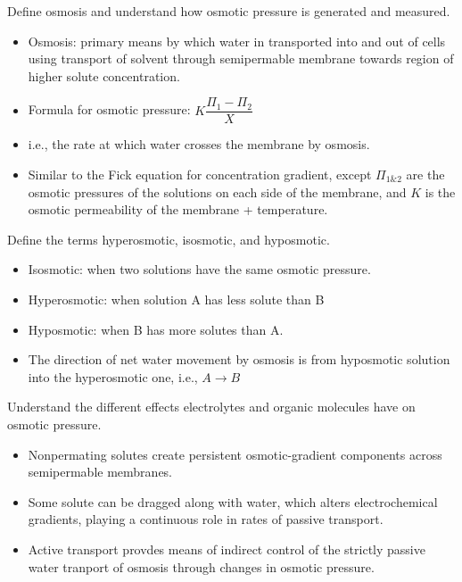 \documentclass[12pt,a4paper]{article}
\begin{document}
\begin{itemize}
    {\color{G-Moon}\item Define osmosis and understand how osmotic pressure is generated and measured.}
        \begin{itemize}
            \item Osmosis: primary means by which water in transported into and out of cells using transport of solvent through semipermable membrane towards region of higher solute concentration.
            \item Formula for osmotic pressure: \(K\dfrac{\Pi_1 - \Pi_2}{X}\)
            \item i.e., the rate at which water crosses the membrane by osmosis.
            \item Similar to the Fick equation for concentration gradient, except $\Pi_{1\&2}$ are the osmotic pressures of the solutions on each side of the membrane, and \(K\) is the osmotic permeability of the membrane + temperature.
        \end{itemize}
    {\color{G-Moon}\item Define the terms hyperosmotic, isosmotic, and hyposmotic.}
        \begin{itemize}
            \item Isosmotic: when two solutions have the same osmotic pressure.
            \item Hyperosmotic: when solution A has less solute than B
            \item Hyposmotic: when B has more solutes than A.
            \item The direction of net water movement by osmosis is from hyposmotic solution into the hyperosmotic one, i.e., \(A \rightarrow B\) 
        \end{itemize}
    {\color{G-Moon}\item Understand the different effects electrolytes and organic molecules have on osmotic pressure.}
        \begin{itemize}
            \item Nonpermating solutes create persistent osmotic-gradient components across semipermable membranes.
            \item Some solute can be dragged along with water, which alters electrochemical gradients, playing a continuous role in rates of passive transport.
            \item Active transport provdes means of indirect control of the strictly passive water tranport of osmosis through changes in osmotic pressure.
        \end{itemize}

\end{itemize}
\end{document}
